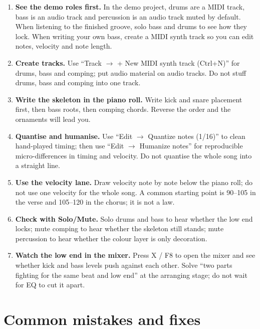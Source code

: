 \begin{enumerate}
\item \textbf{See the demo roles first.} In the demo project, drums are a MIDI track, bass is an audio track and percussion is an audio track muted by default. When listening to the finished groove, solo bass and drums to see how they lock. When writing your own bass, create a MIDI synth track so you can edit notes, velocity and note length.
\item \textbf{Create tracks.} Use ``Track $\rightarrow$ + New MIDI synth track (Ctrl+N)'' for drums, bass and comping; put audio material on audio tracks. Do not stuff drums, bass and comping into one track.
\item \textbf{Write the skeleton in the piano roll.} Write kick and snare placement first, then bass roots, then comping chords. Reverse the order and the ornaments will lead you.
\item \textbf{Quantise and humanise.} Use ``Edit $\rightarrow$ Quantize notes (1/16)'' to clean hand-played timing; then use ``Edit $\rightarrow$ Humanize notes'' for reproducible micro-differences in timing and velocity. Do not quantise the whole song into a straight line.
\item \textbf{Use the velocity lane.} Draw velocity note by note below the piano roll; do not use one velocity for the whole song. A common starting point is 90--105 in the verse and 105--120 in the chorus; it is not a law.
\item \textbf{Check with Solo/Mute.} Solo drums and bass to hear whether the low end locks; mute comping to hear whether the skeleton still stands; mute percussion to hear whether the colour layer is only decoration.
\item \textbf{Watch the low end in the mixer.} Press X / F8 to open the mixer and see whether kick and bass levels push against each other. Solve ``two parts fighting for the same beat and low end'' at the arranging stage; do not wait for EQ to cut it apart.
\end{enumerate}


\section{Common mistakes and fixes}
\label{sec:rhythm-mistakes}

